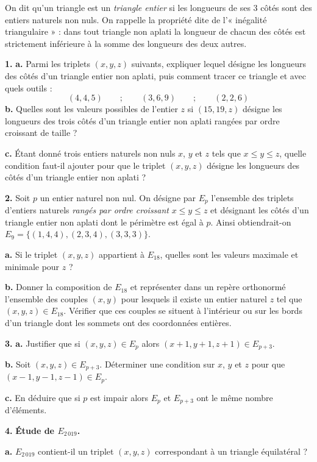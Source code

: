On dit qu'un triangle est un \emph{triangle entier} si les longueurs de ses $3$ côtés sont des entiers naturels non nuls.
On rappelle la propriété dite de l'« inégalité triangulaire » : dans tout triangle non aplati la longueur de chacun
des côtés est strictement inférieure à la somme des longueurs des deux autres.

\textbf{1.} \textbf{a.} Parmi les triplets $(x, y, z)$ suivants, expliquer lequel désigne les longueurs des côtés d'un triangle entier non
aplati, puis comment tracer ce triangle et avec quels outils :
\[
(4, 4, 5) \qquad ; \qquad (3, 6, 9) \qquad ; \qquad (2, 2, 6)
\]
\textbf{b.} Quelles sont les valeurs possibles de l'entier $z$ si $(15, 19, z)$ désigne les longueurs des trois côtés d'un triangle
entier non aplati rangées par ordre croissant de taille ?

\textbf{c.} Étant donné trois entiers naturels non nuls $x$, $y$ et $z$ tels que $x \leqslant y \leqslant z$, quelle condition faut-il ajouter pour
que le triplet $(x, y, z)$ désigne les longueurs des côtés d'un triangle entier non aplati ?

\textbf{2.} Soit $p$ un entier naturel non nul. On désigne par $E_p$ l'ensemble des triplets d'entiers naturels \emph{rangés par ordre
croissant} $x \leqslant y \leqslant z$ et désignant les côtés d'un triangle entier non aplati dont le périmètre est égal à $p$.
Ainsi obtiendrait-on $E_9 = \{(1, 4, 4), (2, 3, 4), (3, 3, 3)\}$.

\textbf{a.} Si le triplet $(x, y, z)$ appartient à $E_{18}$, quelles sont les valeurs maximale et minimale pour $z$ ?

\textbf{b.} Donner la composition de $E_{18}$ et représenter dans un repère orthonormé l'ensemble des couples $(x, y)$ pour
lesquels il existe un entier naturel $z$ tel que $(x, y, z) \in E_{18}$. Vérifier que ces couples se situent à l'intérieur ou sur
les bords d'un triangle dont les sommets ont des coordonnées entières.

\textbf{3.} \textbf{a.} Justifier que si $(x, y, z) \in E_p$ alors $(x + 1, y + 1, z + 1) \in E_{p+3}$.

\textbf{b.} Soit $(x, y, z) \in E_{p+3}$. Déterminer une condition sur $x$, $y$ et $z$ pour que $(x - 1, y - 1, z - 1) \in E_p$.

\textbf{c.} En déduire que si $p$ est impair alors $E_p$ et $E_{p+3}$ ont le même nombre d'éléments.

\textbf{4.} \textbf{Étude de $E_{2\,019}$.}

\textbf{a.} $E_{2\,019}$ contient-il un triplet $(x, y, z)$ correspondant à un triangle équilatéral ?

